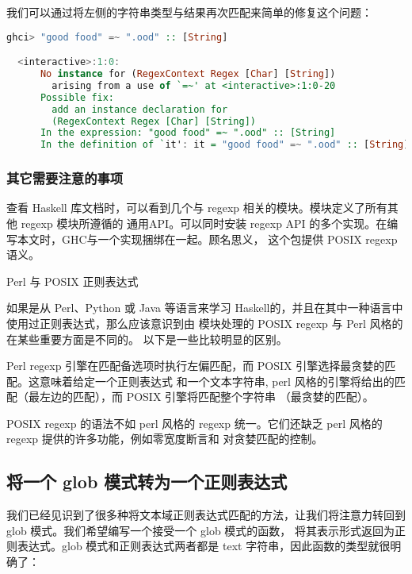 \documentclass[./main.tex]{subfiles}
\begin{document}
我们可以通过将左侧的字符串类型与结果再次匹配来简单的修复这个问题：

\begin{lstlisting}[language=Haskell]
  ghci> "good food" =~ ".ood" :: [String]

  <interactive>:1:0:
      No instance for (RegexContext Regex [Char] [String])
        arising from a use of `=~' at <interactive>:1:0-20
      Possible fix:
        add an instance declaration for
        (RegexContext Regex [Char] [String])
      In the expression: "good food" =~ ".ood" :: [String]
      In the definition of `it': it = "good food" =~ ".ood" :: [String]
\end{lstlisting}

\subsubsection*{其它需要注意的事项}

查看 Haskell 库文档时，可以看到几个与 regexp 相关的模块。模块定义了所有其他 regexp 模块所遵循的
通用API。可以同时安装 regexp API 的多个实现。在编写本文时，GHC与一个实现捆绑在一起。顾名思义，
这个包提供 POSIX regexp 语义。

\begin{anote}
  Perl 与 POSIX 正则表达式

  如果是从 Perl、Python 或 Java 等语言来学习 Haskell的，并且在其中一种语言中使用过正则表达式，那么应该意识到由
  模块处理的 POSIX regexp 与 Perl 风格的在某些重要方面是不同的。
  以下是一些比较明显的区别。

  Perl regexp 引擎在匹配备选项时执行左偏匹配，而 POSIX 引擎选择最贪婪的匹配。这意味着给定一个正则表达式
  和一个文本字符串, perl 风格的引擎将给出的匹配（最左边的匹配），而 POSIX 引擎将匹配整个字符串
  （最贪婪的匹配）。

  POSIX regexp 的语法不如 perl 风格的 regexp 统一。它们还缺乏 perl 风格的 regexp 提供的许多功能，例如零宽度断言和
  对贪婪匹配的控制。
\end{anote}

\subsection*{将一个 glob 模式转为一个正则表达式}

我们已经见识到了很多种将文本域正则表达式匹配的方法，让我们将注意力转回到 glob 模式。我们希望编写一个接受一个 glob 模式的函数，
将其表示形式返回为正则表达式。glob 模式和正则表达式两者都是 text 字符串，因此函数的类型就很明确了：
\end{document}
